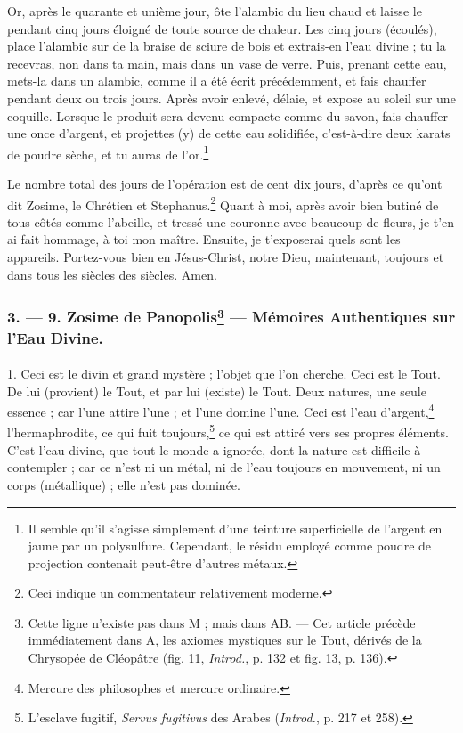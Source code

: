 \documentclass[a4paper, 11pt, oneside, polutonikogreek, french]{article}
\begin{document}
Or, après le quarante et unième jour, ôte l'alambic du lieu chaud et laisse le pendant cinq jours éloigné de toute source de chaleur. Les cinq jours (écoulés), place l'alambic sur de la braise de sciure de bois et extrais-en l'eau divine ; tu la recevras, non dans ta main, mais dans un vase de verre. Puis, prenant cette eau, mets-la dans un alambic, comme il a été écrit précédemment, et fais chauffer pendant deux ou trois jours. Après avoir enlevé, délaie, et expose au soleil sur une coquille. Lorsque le produit sera devenu compacte comme du savon, fais chauffer une once d'argent, et projettes (y) de cette eau solidifiée, c'est-à-dire deux karats de poudre sèche, et tu auras de l'or.\footnote{Il semble qu'il s'agisse simplement d'une teinture superficielle de l'argent en jaune par un polysulfure. Cependant, le résidu employé comme poudre de projection contenait peut-être d'autres métaux.}

Le nombre total des jours de l'opération est de cent dix jours, d'après ce qu'ont dit Zosime, le Chrétien et Stephanus.\footnote{Ceci indique un commentateur relativement moderne.} Quant à moi, après avoir bien butiné de tous côtés comme l'abeille, et tressé une couronne avec beaucoup de fleurs, je t'en ai fait hommage, à toi mon maître. Ensuite, je t'exposerai quels sont les appareils. Portez-vous bien en Jésus-Christ, notre Dieu, maintenant, toujours et dans tous les siècles des siècles. Amen.

\bigskip
\centerline{\EightStarTaper}
\centerline{\EightStarTaper\EightStarTaper}
\bigskip

\subsubsection[3. --- 9. Zosime de Panopolis --- Mémoires Authentiques sur l'Eau Divine.]{3. --- 9. Zosime de Panopolis\footnote{Cette ligne n'existe pas dans M ; mais dans AB. --- Cet article précède immédiatement dans A, les axiomes mystiques sur le Tout, dérivés de la Chrysopée de Cléopâtre (fig. 11, \emph{Introd.}, p. 132 et fig. 13, p. 136).} --- Mémoires Authentiques sur l'Eau Divine.}
\paragraph{}
1. Ceci est le divin et grand mystère ; l'objet que l'on cherche. Ceci est le Tout. De lui (provient) le Tout, et par lui (existe) le Tout. Deux natures, une seule essence ; car l'une attire l'une ; et l'une domine l'une. Ceci est l'eau d'argent,\footnote{Mercure des philosophes et mercure ordinaire.} l'hermaphrodite, ce qui fuit toujours,\footnote{L'esclave fugitif, \emph{Servus fugitivus} des Arabes (\emph{Introd.}, p. 217 et 258).} ce qui est attiré vers ses propres éléments. C'est l'eau divine, que tout le monde a ignorée, dont la nature est difficile à contempler ; car ce n'est ni un métal, ni de l'eau toujours en mouvement, ni un corps (métallique) ; elle n'est pas dominée.
\end{document}
